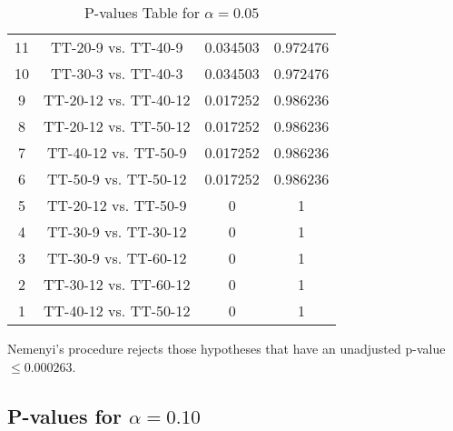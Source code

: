 \documentclass[a4paper,10pt]{article}
\begin{document}
\begin{landscape}
\begin{table}[!htp]
\begin{tabular}{cccc}
11&TT-20-9 vs. TT-40-9&0.034503&0.972476\\
10&TT-30-3 vs. TT-40-3&0.034503&0.972476\\
9&TT-20-12 vs. TT-40-12&0.017252&0.986236\\
8&TT-20-12 vs. TT-50-12&0.017252&0.986236\\
7&TT-40-12 vs. TT-50-9&0.017252&0.986236\\
6&TT-50-9 vs. TT-50-12&0.017252&0.986236\\
5&TT-20-12 vs. TT-50-9&0&1\\
4&TT-30-9 vs. TT-30-12&0&1\\
3&TT-30-9 vs. TT-60-12&0&1\\
2&TT-30-12 vs. TT-60-12&0&1\\
1&TT-40-12 vs. TT-50-12&0&1\\
\hline
\end{tabular}
\caption{P-values Table for $\alpha=0.05$}
\end{table}Nemenyi's procedure rejects those hypotheses that have an unadjusted p-value $\le0.000263$.

\pagebreak

\subsection{P-values for $\alpha=0.10$}


\end{landscape}
\end{document}
